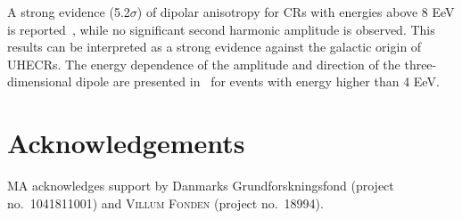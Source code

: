 \documentclass{PoS}
\begin{document}
A strong evidence (5.2$\sigma$) of dipolar anisotropy for CRs with energies above 8 EeV is reported~\cite{Aab:2017tyv}, while no significant second harmonic amplitude is observed. This results can be interpreted as a strong evidence against the galactic origin of UHECRs. The energy dependence of the amplitude and direction of the three-dimensional dipole are presented in~\cite{Aab:2018mmi} for events with energy higher than 4 EeV. 



\section*{Acknowledgements}
MA acknowledges support by Danmarks Grundforskningsfond (project no.~1041811001) and \textsc{Villum Fonden} (project no.~18994).



\end{document}
